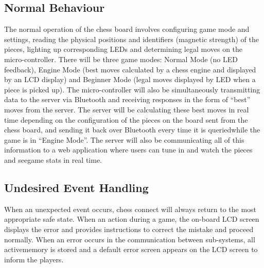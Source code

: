 \documentclass[12pt, titlepage]{article}
\begin{document}
\subsection{Normal Behaviour}{
The normal operation of the chess board involves configuring game mode and settings, reading the physical 
positions and identifiers (magnetic strength) of the pieces, lighting up corresponding LEDs and determining 
legal moves on the micro-controller. There will be three game modes: Normal Mode (no LED feedback), Engine 
Mode (best moves calculated by a chess engine and displayed by an LCD display) and Beginner Mode (legal moves
 displayed by LED when a piece is picked up). The micro-controller will also be simultaneously transmitting 
 data to the server via Bluetooth and receiving responses in the form of ``best'' moves from the server. The 
 server will be calculating these best moves in real time depending on the configuration of the pieces on the 
 board sent from the chess board, and sending it back over Bluetooth every time it is queriedwhile the game is
  in ``Engine Mode''. The server will also be communicating all of this information to a web application where 
  users can tune in and watch the pieces and seegame stats in real time.
}

\subsection{Undesired Event Handling}
When an unexpected event occurs, chess connect will always return to the most 
appropriate safe state. When an action during a game, the on-board LCD screen 
displays the error and provides instructions to correct the mistake and proceed 
normally. When an error occurs in the communication between sub-systems, all 
activememory is stored and a default error screen appears on the LCD screen to 
inform the players.
\end{document}
